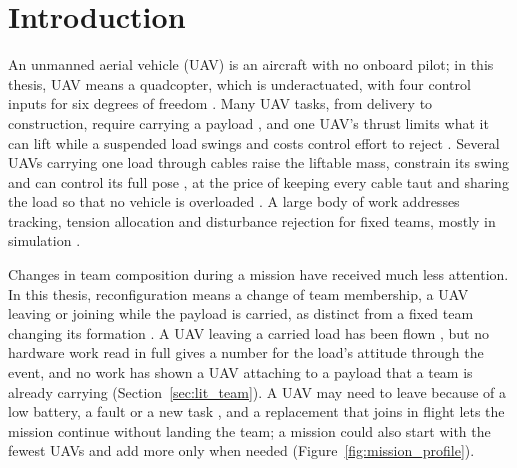 \section{Introduction}

An unmanned aerial vehicle (UAV) is an aircraft with no onboard pilot; in this thesis, UAV means a quadcopter, which
is underactuated, with four control inputs for six degrees of freedom \cite{kotaruDifferentialflatnessControlQuadrotors2018}.
Many UAV tasks, from delivery to construction, require carrying a payload \cite{kardaszDronesPossibilitiesTheir2016,
olleroPresentFutureAerial2022, thusooQUADROTORSPRESENTERA2021}, and one UAV's thrust limits what it can lift while a
suspended load swings and costs control effort to reject \cite{geronelDynamicResponsesDue2023}. Several UAVs carrying
one load through cables raise the liftable mass, constrain its swing and can control its full pose
\cite{tudelft, mohammadiDecentralizedMotionControl2018}, at the price of keeping every cable taut and sharing the load
so that no vehicle is overloaded \cite{kotaruDynamicsControlQuadrotor2017}. A large body of work addresses tracking,
tension allocation and disturbance rejection for fixed teams, mostly in simulation \cite{lv2026review,
estevezReviewAerialTransportation2024}.

Changes in team composition during a mission have received much less attention. In this thesis, reconfiguration means
a change of team membership, a UAV leaving or joining while the payload is carried, as distinct from a fixed team
changing its formation \cite{jackson2020scalable}. A UAV leaving a carried load has been flown
\cite{quan2025swarm, zeng2025marl}, but no hardware work read in full gives a number for the load's attitude through
the event, and no work has shown a UAV attaching to a payload that a team is already carrying (Section~\ref{sec:lit_team}).
A UAV may need to leave because of a low battery, a fault or a new task \cite{farrasFaultTolerantControlMultiQuadcopter2024},
and a replacement that joins in flight lets the mission continue without landing the team; a mission could also start
with the fewest UAVs and add more only when needed (Figure~\ref{fig:mission_profile}).


